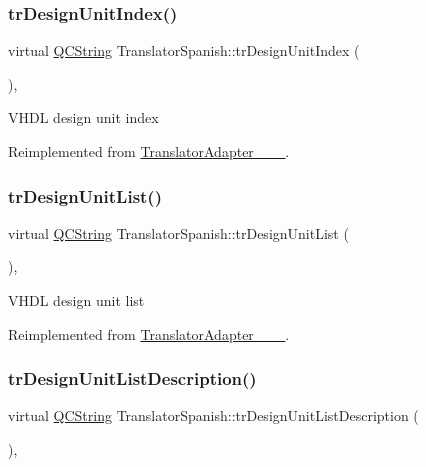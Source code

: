 \subsubsection{\texorpdfstring{trDesignUnitIndex()}{trDesignUnitIndex()}}
{\footnotesize\ttfamily virtual \mbox{\hyperlink{class_q_c_string}{Q\+C\+String}} Translator\+Spanish\+::tr\+Design\+Unit\+Index (\begin{DoxyParamCaption}{ }\end{DoxyParamCaption})\hspace{0.3cm}{\ttfamily [inline]}, {\ttfamily [virtual]}}

V\+H\+DL design unit index 

Reimplemented from \mbox{\hyperlink{class_translator_adapter__1__8__15}{Translator\+Adapter\+\_\+\_\+\_}}.

\mbox{\label{class_translator_spanish_a451db713e2e9d96180f2032512d2db76}} 
\subsubsection{\texorpdfstring{trDesignUnitList()}{trDesignUnitList()}}
{\footnotesize\ttfamily virtual \mbox{\hyperlink{class_q_c_string}{Q\+C\+String}} Translator\+Spanish\+::tr\+Design\+Unit\+List (\begin{DoxyParamCaption}{ }\end{DoxyParamCaption})\hspace{0.3cm}{\ttfamily [inline]}, {\ttfamily [virtual]}}

V\+H\+DL design unit list 

Reimplemented from \mbox{\hyperlink{class_translator_adapter__1__8__15}{Translator\+Adapter\+\_\+\_\+\_}}.

\mbox{\label{class_translator_spanish_a3ba90809e4d240b2a041d12accf1d42f}} 
\subsubsection{\texorpdfstring{trDesignUnitListDescription()}{trDesignUnitListDescription()}}
{\footnotesize\ttfamily virtual \mbox{\hyperlink{class_q_c_string}{Q\+C\+String}} Translator\+Spanish\+::tr\+Design\+Unit\+List\+Description (\begin{DoxyParamCaption}{ }\end{DoxyParamCaption})\hspace{0.3cm}{\ttfamily [inline]}, {\ttfamily [virtual]}}


